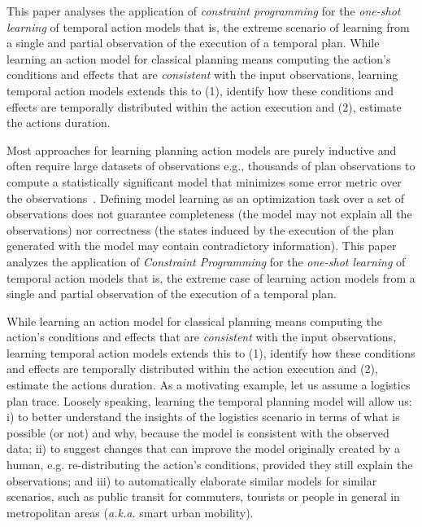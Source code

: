 \documentclass[runningheads]{llncs}
\begin{document}
This paper analyses the application of {\em constraint programming} for the {\em one-shot learning} of temporal action models that is, the extreme scenario of learning from a single and partial observation of the execution of a temporal plan. While learning an action model for classical planning means computing the action's conditions and effects that are {\em consistent} with the input observations, learning temporal action models extends this to (1), identify how these conditions and effects are temporally distributed within the action execution and (2), estimate the actions duration.

Most approaches for learning planning action models are purely inductive and often require large datasets of observations e.g., thousands of plan observations to compute a statistically significant model that minimizes some error metric over the observations~\cite{yang2007learning,MouraoZPS12,zhuo2013action,kuvcera2018louga}. Defining model learning as an optimization task over a set of observations does not guarantee completeness (the model may not explain all the observations) nor correctness (the states induced by the execution of the plan generated with the model may contain contradictory information). This paper analyzes the application of {\em Constraint Programming} for the {\em one-shot learning} of temporal action models that is, the extreme case of learning action models from a single and partial observation of the execution of a temporal plan.

While learning an action model for classical planning means computing the action's conditions and effects that are {\em consistent} with the input observations, learning temporal action models extends this to (1), identify how these conditions and effects are temporally distributed within the action execution and (2), estimate the actions duration. As a motivating example, let us assume a logistics plan trace. Loosely speaking, learning the temporal planning model will allow us: i) to better understand the insights of the logistics scenario in terms of what is possible (or not) and why, because the model is consistent with the observed data; ii) to suggest changes that can improve the model originally created by a human, e.g. re-distributing the action's conditions, provided they still explain the observations; and iii) to automatically elaborate similar models for similar scenarios, such as public transit for commuters, tourists or people in general in metropolitan areas (\emph{a.k.a.} smart urban mobility).
\end{document}
